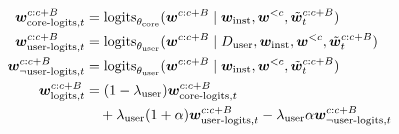 \small
\begin{align*}
    \boldsymbol{w}_{\text{core-logits}, t}^{c:c+B} &= \operatorname{logits}_{\theta_{\text{core}}}(\boldsymbol{w}^{c:c+B} \mid \boldsymbol{w}_{\text{inst}}, \boldsymbol{w}^{<c}, \Tilde{\boldsymbol{w}}_t^{c:c+B}) \\
    \boldsymbol{w}_{\text{user-logits}, t}^{c:c+B} &= \operatorname{logits}_{\theta_{\text{user}}}(\boldsymbol{w}^{c:c+B} \mid D_{\text{user}}, \boldsymbol{w}_{\text{inst}}, \boldsymbol{w}^{<c}, \Tilde{\boldsymbol{w}}_t^{c:c+B}) \\
    \boldsymbol{w}_{\neg \text{user-logits}, t}^{c:c+B} &= \operatorname{logits}_{\theta_{\text{user}}}(\boldsymbol{w}^{c:c+B} \mid \boldsymbol{w}_{\text{inst}}, \boldsymbol{w}^{<c}, \Tilde{\boldsymbol{w}}_t^{c:c+B}) \\
    \boldsymbol{w}_{\text{logits}, t}^{c:c+B} &= (1-\lambda_{\text{user}}) \boldsymbol{w}_{\text{core-logits}, t}^{c:c+B} \\
    &\quad + \lambda_{\text{user}} (1+\alpha) \boldsymbol{w}_{\text{user-logits}, t}^{c:c+B} - \lambda_{\text{user}} \alpha \boldsymbol{w}_{\neg \text{user-logits}, t}^{c:c+B}
\end{align*}
